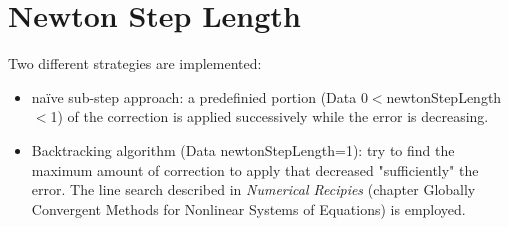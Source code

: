 \documentclass{article}
\begin{document}
\section{Newton Step Length}

Two different strategies are implemented:
\begin{itemize}
\item naïve sub-step approach: a predefinied portion (Data 0$<$newtonStepLength$<$1) of the correction is applied successively while the error is decreasing.
\item Backtracking algorithm (Data newtonStepLength=1): try to find the maximum amount of correction to apply that decreased "sufficiently" the error. The line search described in \textit{Numerical Recipies} (chapter Globally Convergent Methods for Nonlinear Systems of Equations) is employed.
\end{itemize}
\end{document}
